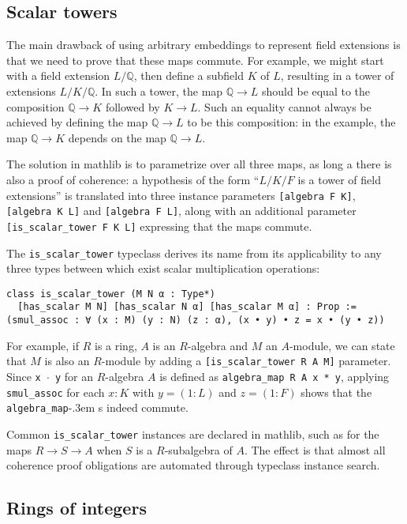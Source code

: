 \documentclass[a4paper,USenglish,cleveref, autoref, thm-restate]{lipics-v2021}
\newcommand{\lean}[1]{\texttt{#1}\xspace} %
\newcommand{\mathlib}{\textsf{mathlib}\xspace}
\newcommand{\Q}{\mathbb{Q}}
\begin{document}
\subsection{Scalar towers} \label{sec:scalar_tower}

The main drawback of using arbitrary embeddings to represent field extensions is that we need to prove that these maps commute.
For example, we might start with a field extension $L / \Q$, then define a subfield $K$ of $L$,
resulting in a tower of extensions $L / K / \Q$.
In such a tower, the map $\Q \to L$ should be equal to the composition $\Q \to K$ followed by $K \to L$.
Such an equality cannot always be achieved by defining the map $\Q \to L$ to be this composition: in the example, the map $\Q \to K$ depends on the map $\Q \to L$.

The solution in \mathlib is to parametrize over all three maps, as long a there is also a proof of coherence:
a hypothesis of the form ``$L / K / F$ is a tower of field extensions'' is translated into three instance parameters \lean{[algebra F K]}, \lean{[algebra K L]} and \lean{[algebra F L]},
along with an additional parameter \lean{[is\_scalar\_tower F K L]} expressing that the maps commute.

The \lean{is\_scalar\_tower} typeclass derives its name from its applicability to any three types between which exist scalar multiplication operations:
\begin{lstlisting}
class is_scalar_tower (M N α : Type*)
  [has_scalar M N] [has_scalar N α] [has_scalar M α] : Prop :=
(smul_assoc : ∀ (x : M) (y : N) (z : α), (x • y) • z = x • (y • z))
\end{lstlisting}
For example, if $R$ is a ring, $A$ is an $R$-algebra and $M$ an $A$-module, we can state that $M$ is also an $R$-module by adding a \lean{[is\_scalar\_tower R A M]} parameter.
Since \lean{x~$\cdot$~y} for an $R$-algebra $A$ is defined as \lean{algebra\_map R A x * y}, applying \lean{smul\_assoc} for each $x : K$ with $y = (1 : L)$ and $z = (1 : F)$ shows that the \lean{algebra\_map}\kern-.3em s indeed commute.

Common \lean{is\_scalar\_tower} instances are declared in \mathlib,
such as for the maps $R \to S \to A$ when $S$ is a $R$-subalgebra of $A$.
The effect is that almost all coherence proof obligations are automated through typeclass instance search.

\subsection{Rings of integers} \label{sec:ring-of-integers}
\end{document}
